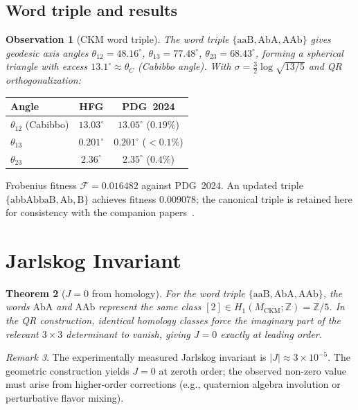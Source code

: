 \documentclass[11pt,a4paper]{article}
\newtheorem{theorem}{Theorem}
\newtheorem{observation}[theorem]{Observation}
\theoremstyle{remark}
\newtheorem{remark}[theorem]{Remark}
\newcommand{\MCKM}{M_{\mathrm{CKM}}}
\newcommand{\Zfive}{\mathbb{Z}/5}
\newcommand{\ZZ}{\mathbb{Z}}
\begin{document}
\subsection{Word triple and results}

\begin{observation}[CKM word triple]
\label{obs:triple}
The word triple $\{\mathrm{aaB},\mathrm{AbA},\mathrm{AAb}\}$
gives geodesic axis angles
$\theta_{12}=48.16^\circ$, $\theta_{13}=77.48^\circ$,
$\theta_{23}=68.43^\circ$,
forming a spherical triangle with excess $13.1^\circ \approx \theta_C$
(Cabibbo angle).
With $\sigma=\frac{3}{2}\log\sqrt{13/5}$ and QR orthogonalization:
\end{observation}

\begin{center}
\begin{tabular}{lcc}
\toprule
Angle & HFG & PDG~2024 \\
\midrule
$\theta_{12}$ (Cabibbo) & $13.03^\circ$ & $13.05^\circ$ ($0.19\%$) \\
$\theta_{13}$ & $0.201^\circ$ & $0.201^\circ$ ($<0.1\%$) \\
$\theta_{23}$ & $2.36^\circ$ & $2.35^\circ$ ($0.4\%$) \\
\bottomrule
\end{tabular}
\end{center}

Frobenius fitness $\mathcal{F} = 0.016482$ against PDG~2024.
An updated triple $\{\mathrm{abbAbbaB},\mathrm{Ab},\mathrm{B}\}$
achieves fitness $0.009078$; the canonical triple is retained here
for consistency with the companion papers~\cite{Gentry:Unified}.

\section{Jarlskog Invariant}
\label{sec:jarlskog}

\begin{theorem}[$J=0$ from homology]
\label{thm:J}
For the word triple $\{\mathrm{aaB},\mathrm{AbA},\mathrm{AAb}\}$,
the words $\mathrm{AbA}$ and $\mathrm{AAb}$ represent the same
class $[2] \in H_1(\MCKM;\ZZ) = \Zfive$.
In the QR construction, identical homology classes force the
imaginary part of the relevant $3\times3$ determinant to vanish,
giving $J = 0$ exactly at leading order.
\end{theorem}

\begin{remark}
The experimentally measured Jarlskog invariant is $|J|\approx3\times10^{-5}$.
The geometric construction yields $J=0$ at zeroth order; the observed
non-zero value must arise from higher-order corrections (e.g., quaternion
algebra involution or perturbative flavor mixing).
\end{remark}
\end{document}
